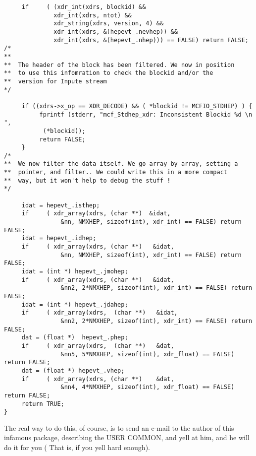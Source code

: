 \begin{verbatim}
     if     ( (xdr_int(xdrs, blockid) &&
     	      xdr_int(xdrs, ntot) &&
     	      xdr_string(xdrs, version, 4) &&
     	      xdr_int(xdrs, &(hepevt_.nevhep)) &&
              xdr_int(xdrs, &(hepevt_.nhep))) == FALSE) return FALSE;
/*
**
**	The header of the block has been filtered. We now in position
**	to use this infomration to check the blockid and/or the 
**	version for Inpute stream
*/
              
     if ((xdrs->x_op == XDR_DECODE) && ( *blockid != MCFIO_STDHEP) ) {
          fprintf (stderr, "mcf_Stdhep_xdr: Inconsistent Blockid %d \n ", 
           (*blockid));
          return FALSE;
     }
/*
**	We now filter the data itself. We go array by array, setting a 
**	pointer, and filter.. We could write this in a more compact
**	way, but it won't help to debug the stuff !
*/

     idat = hepevt_.isthep;
     if     ( xdr_array(xdrs, (char **)  &idat,
                &nn, NMXHEP, sizeof(int), xdr_int) == FALSE) return FALSE;
     idat = hepevt_.idhep;
     if     ( xdr_array(xdrs, (char **)   &idat,
                &nn, NMXHEP, sizeof(int), xdr_int) == FALSE) return FALSE;
     idat = (int *) hepevt_.jmohep;
     if     ( xdr_array(xdrs, (char **)   &idat,
                &nn2, 2*NMXHEP, sizeof(int), xdr_int) == FALSE) return FALSE;
     idat = (int *) hepevt_.jdahep;
     if     ( xdr_array(xdrs,  (char **)   &idat,
                &nn2, 2*NMXHEP, sizeof(int), xdr_int) == FALSE) return FALSE;
     dat = (float *)  hepevt_.phep;
     if     ( xdr_array(xdrs,  (char **)   &dat,
                &nn5, 5*NMXHEP, sizeof(int), xdr_float) == FALSE) return FALSE; 
     dat = (float *) hepevt_.vhep;
     if     ( xdr_array(xdrs, (char **)    &dat,
                &nn4, 4*NMXHEP, sizeof(int), xdr_float) == FALSE) return FALSE;
     return TRUE;
}   

\end{verbatim}

The real way to do this, of course, is to send an e-mail to the 
author of this infamous package, describing the USER COMMON, and  yell 
at him, and he will do it for you ( That is, if you yell hard enough). 




